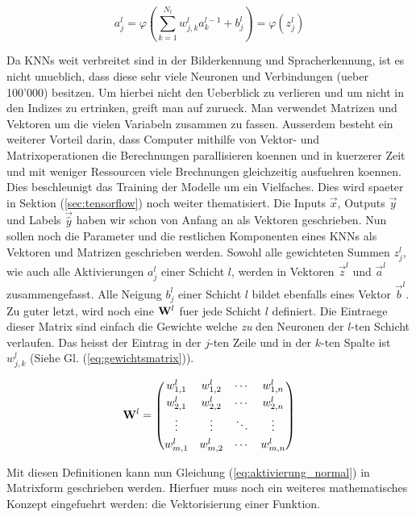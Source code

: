 \documentclass[../main]{subfiles}
\begin{document}
\begin{equation}\label{eq:aktivierung_normal}
  a_j^l = \varphi\left(\sum_{k=1}^{N_l} w_{j,k}^l a_k^{l-1} + b_j^l \right) = \varphi \left( z_j^l \right)
\end{equation}
\par\bigskip
Da KNNs weit verbreitet sind in der Bilderkennung und Spracherkennung, ist es
nicht unueblich, dass diese sehr viele Neuronen und Verbindungen (ueber 100'000) besitzen.
Um hierbei nicht den Ueberblick zu verlieren und um nicht in den Indizes zu
ertrinken, greift man auf  zurueck. Man verwendet
Matrizen und Vektoren um die vielen Variabeln zusammen zu fassen.
Ausserdem besteht ein weiterer Vorteil darin, dass Computer mithilfe von Vektor-
und Matrixoperationen die Berechnungen parallisieren koennen und in kuerzerer
Zeit und mit weniger Ressourcen viele Brechnungen gleichzeitig ausfuehren koennen.
Dies beschleunigt das Training der Modelle um
ein Vielfaches. Dies wird spaeter in Sektion
(\ref{sec:tensorflow}) noch weiter thematisiert.
\para
Die Inputs $\vec{x}$, Outputs $\vec{y}$ und Labels $\vec{\hat{y}}$ haben wir schon von Anfang an als Vektoren geschrieben.
Nun sollen noch die Parameter und die restlichen Komponenten eines KNNs als Vektoren und Matrizen geschrieben werden.
Sowohl alle gewichteten Summen $z_j^l$, wie auch alle Aktivierungen $a_j^l$
einer Schicht $l$, werden in Vektoren $\vec{z}^l$ und $\vec{a}^l$ zusammengefasst.
Alle Neigung $b_j^l$ einer Schicht $l$ bildet ebenfalls eines Vektor $\vec{b}^l$.
Zu guter letzt, wird noch eine  $\mathbf{W}^l$ fuer jede
Schicht $l$ definiert.
Die Eintraege dieser Matrix sind einfach die Gewichte welche \textit{zu} den Neuronen der
$l$-ten Schicht verlaufen. Das heisst der Eintrag in der $j$-ten Zeile und in
der $k$-ten Spalte ist $w_{j,k}^l$ (Siehe Gl. (\ref{eq:gewichtsmatrix})).

\begin{equation}\label{eq:gewichtsmatrix}
  \mathbf{W}^l =
  \begin{pmatrix}
    w_{1,1}^l & w_{1,2}^l & \cdots & w_{1,n}^l \\[0.3em]
    w_{2,1}^l & w_{2,2}^l & \cdots & w_{2,n}^l \\[0.3em]
    \vdots & \vdots & \ddots & \vdots \\[0.3em]
    w_{m,1}^l & w_{m,2}^l & \cdots & w_{m,n}^l
  \end{pmatrix}
\end{equation}

Mit diesen Definitionen kann nun Gleichung (\ref{eq:aktivierung_normal}) in
Matrixform geschrieben werden. Hierfuer muss noch ein weiteres mathematisches
Konzept eingefuehrt werden: die Vektorisierung einer Funktion.
\para
\end{document}
